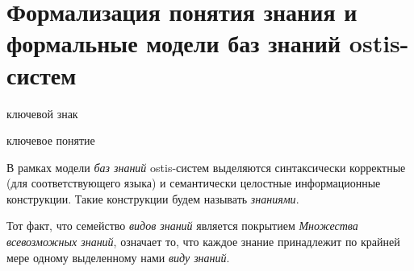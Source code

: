 \section{Формализация понятия знания и формальные модели баз знаний ostis-систем}
\label{sec_kb}

\begin{SCn}
	\begin{scnrelfromlist}{ключевой знак}
	\end{scnrelfromlist}
\end{SCn}

\begin{SCn}
	\begin{scnrelfromlist}{ключевое понятие}
	\end{scnrelfromlist}
\end{SCn}


В рамках модели \textit{баз знаний} ostis-систем выделяются синтаксически корректные (для соответствующего языка) и семантически целостные информационные конструкции. Такие конструкции будем называть \textit{знаниями}.

\begin{SCn}
	\begin{scnindent}
	\end{scnindent}
\end{SCn}

Тот факт, что семейство \textit{видов знаний} является покрытием \textit{Множества всевозможных знаний}, означает то, что каждое знание принадлежит по крайней мере одному выделенному нами \textit{виду знаний}.

